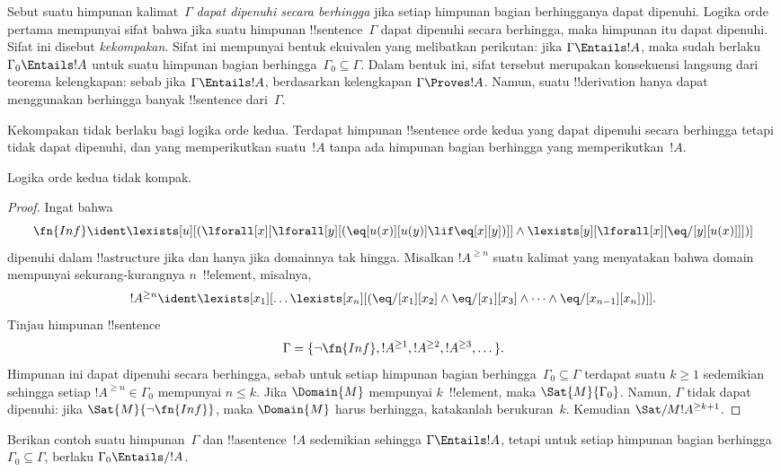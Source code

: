 \documentclass[../../../include/open-logic-section]{subfiles}
\begin{document}


\begin{explain}
Sebut suatu himpunan kalimat~$\Gamma$ \emph{dapat dipenuhi secara berhingga}
jika setiap himpunan bagian berhingganya dapat dipenuhi. Logika orde pertama
mempunyai sifat bahwa jika suatu himpunan !!{sentence}~$\Gamma$ dapat
dipenuhi secara berhingga, maka himpunan itu dapat dipenuhi. Sifat ini disebut
\emph{kekompakan}. Sifat ini mempunyai bentuk ekuivalen yang melibatkan
perikutan: jika $\Gamma \Entails !A$, maka sudah berlaku $\Gamma_0 \Entails
!A$ untuk suatu himpunan bagian berhingga~$\Gamma_0 \subseteq \Gamma$. Dalam
bentuk ini, sifat tersebut merupakan konsekuensi langsung dari teorema
kelengkapan: sebab jika $\Gamma \Entails !A$, berdasarkan kelengkapan
$\Gamma \Proves !A$. Namun, suatu !!{derivation} hanya dapat menggunakan
berhingga banyak !!{sentence} dari~$\Gamma$.

Kekompakan tidak berlaku bagi logika orde kedua. Terdapat himpunan
!!{sentence} orde kedua yang dapat dipenuhi secara berhingga tetapi tidak
dapat dipenuhi, dan yang memperikutkan suatu~$!A$ tanpa ada himpunan bagian
berhingga yang memperikutkan~$!A$.
\end{explain}


\begin{thm}
Logika orde kedua tidak kompak.
\end{thm}

\begin{proof}
Ingat bahwa
\[
\fn{Inf} \ident \lexists[u][(\lforall[x][\lforall[y][(\eq[u(x)][u(y)]
      \lif \eq[x][y])]] \land \lexists[y][\lforall[x][\eq/[y][u(x)]]])]
\]
dipenuhi dalam !!a{structure} jika dan hanya jika domainnya tak hingga.
Misalkan $!A^{\ge n}$ suatu kalimat yang menyatakan bahwa domain mempunyai
sekurang-kurangnya $n$~!!{element}, misalnya,
\[
!A^{\ge n} \ident \lexists[x_1][\dots\lexists[x_n][(\eq/[x_1][x_2]
    \land \eq/[x_1][x_3] \land \dots \land \eq/[x_{n-1}][x_n])]].
\]
Tinjau himpunan !!{sentence}
\[
\Gamma = \{\lnot \fn{Inf}, !A^{\ge 1}, !A^{\ge 2}, !A^{\ge 3}, \dots\}.
\]
Himpunan ini dapat dipenuhi secara berhingga, sebab untuk setiap himpunan
bagian berhingga~$\Gamma_0 \subseteq \Gamma$ terdapat suatu $k \ge 1$
sedemikian sehingga setiap $!A^{\ge n} \in \Gamma_0$ mempunyai $n \le k$.
Jika $\Domain{M}$ mempunyai $k$~!!{element}, maka
$\Sat{M}{\Gamma_0}$. Namun,
$\Gamma$ tidak dapat dipenuhi: jika $\Sat{M}{\lnot \fn{Inf}}$, maka
$\Domain{M}$ harus berhingga, katakanlah berukuran~$k$. Kemudian
$\Sat/{M}{!A^{\ge k+1}}$.
\end{proof}

\begin{prob}
Berikan contoh suatu himpunan~$\Gamma$ dan !!a{sentence}~$!A$ sedemikian
sehingga $\Gamma \Entails !A$, tetapi untuk setiap himpunan bagian
berhingga~$\Gamma_0 \subseteq \Gamma$, berlaku $\Gamma_0 \Entails/ !A$.
\end{prob}
\end{document}
